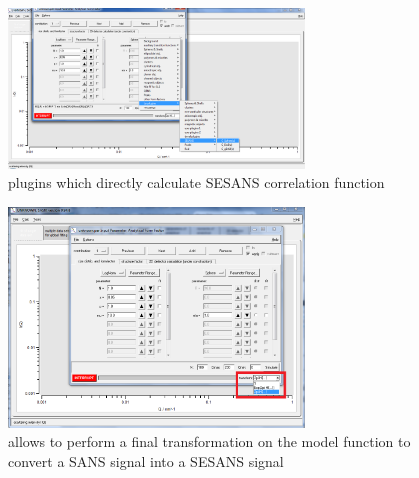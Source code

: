 \begin{figure}[htb]
\begin{center}
\includegraphics[width=0.7\textwidth]{../images/GUI/GzPlugins.png}
\end{center}
\caption{\SASfit plugins which directly calculate SESANS correlation function}
\label{fig:HankelOp}
\end{figure}

\begin{figure}[htb]
\begin{center}
\includegraphics[width=0.7\textwidth]{../images/GUI/HankelOperator.png}
\end{center}
\caption{\SASfit allows to perform a final transformation on the model function to convert a SANS signal into a SESANS signal}
\label{fig:HankelOp}
\end{figure}


